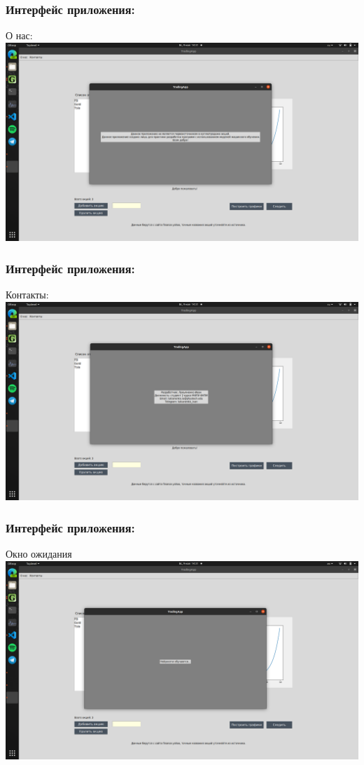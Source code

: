 \documentclass{beamer}
\begin{document}
\begin{frame}
 \frametitle{Интерфейс приложения:}
 О нас:\\
 \includegraphics[scale=0.176]{About.png}
\end{frame}

\begin{frame}
 \frametitle{Интерфейс приложения:}
 Контакты:\\
 \includegraphics[scale=0.176]{Contacts.png}
\end{frame}

\begin{frame}
 \frametitle{Интерфейс приложения:}
 Окно ожидания\\
 \includegraphics[scale=0.176]{NNlearning.png}
\end{frame}
\end{document}
